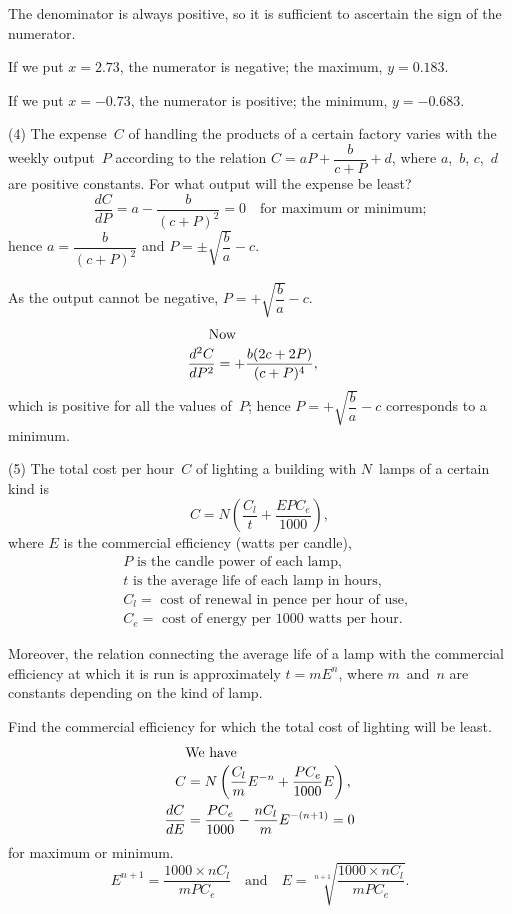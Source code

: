 \documentclass[12pt]{book}[2005/09/16]
\newcommand{\DPPageSep}[2]{\Pagelabel{#2}}
\newcommand{\Pagelabel}[1]
  {\phantomsection\label{#1}}
\begin{document}
The denominator is always positive, so it is sufficient
to ascertain the sign of the numerator.

If we put $x = 2.73$, the numerator is negative; the
maximum, $y = 0.183$.

If we put $x=-0.73$, the numerator is positive; the
minimum, $y=-0.683$.

(4) The expense~$C$ of handling the products of a
certain factory varies with the weekly output~$P$
according to the relation $C = aP + \dfrac{b}{c+P} + d$, where
$a$,~$b$, $c$,~$d$ are positive constants. For what output
will the expense be least?
\[
\dfrac{dC}{dP} = a - \frac{b}{(c+P)^2} = 0\quad \text{for maximum or minimum;}
\]
hence $a = \dfrac{b}{(c+P)^2}$ and $P = ±\sqrt{\dfrac{b}{a}} - c$.

As the output cannot be negative, $P=+\sqrt{\dfrac{b}{a}} - c$.
\DPPageSep{129.png}{117}%
\begin{align*}
\intertext{\indent Now}
\frac{d^2C}{dP^2} &= + \frac{b(2c + 2P)}{(c + P)^4},
\end{align*}
which is positive for all the values of~$P$; hence
$P = +\sqrt{\dfrac{b}{a}} - c$ corresponds to a minimum.

(5) The total cost per hour~$C$ of lighting a building
with $N$~lamps of a certain kind is
\[
C = N\left(\frac{C_l}{t} + \frac{EPC_e}{1000}\right),
\]
where $E$ is the commercial efficiency (watts per candle),
\begin{align*}
&\text{$P$~is the candle power of each lamp,} \\
&\text{$t$~is the average life of each lamp in hours,} \\
&\text{$C_l =$ cost of renewal in pence per hour of use,} \\
&\text{$C_e =$ cost of energy per $1000$~watts per~hour.}
\end{align*}

Moreover, the relation connecting the average life
of a lamp with the commercial efficiency at which it
is run is approximately $t = mE^n$, where $m$~and~$n$ are
constants depending on the kind of lamp.

Find the commercial efficiency for which the total
cost of lighting will be least.
%
\begin{align*}
\intertext{\indent We have}
C &= N\left(\frac{C_l}{m} E^{-n} + \frac{PC_e}{1000} E\right), \\
\dfrac{dC}{dE}
  &= \frac{PC_e}{1000} - \frac{nC_l}{m} E^{-(n+1)} = 0
\end{align*}
for maximum or minimum.
\[
E^{n+1} = \frac{1000 × nC_l}{mPC_e}\quad \text{and}\quad
E = \sqrt[n+1]{\frac{1000 × nC_l}{mPC_e}}.
\]
\DPPageSep{130.png}{118}%
\end{document}
